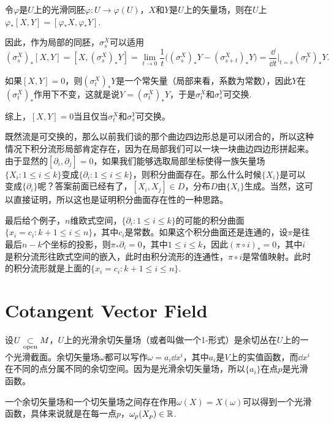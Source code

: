 \para 令$\varphi$是$U$上的光滑同胚$\varphi:U\to \varphi(U)$，$X$和$Y$是$U$上的矢量场，则在$U$上$\varphi_{*}[X,Y]=[\varphi_{*}X,\varphi_{*}Y]$.

因此，作为局部的同胚，$\sigma_s^X$可以适用
\[
	(\sigma_s^X)_*[X,Y]=[X,(\sigma_s^X)_*Y]=\lim_{t\to 0}\frac{1}{t}\bigl((\sigma_s^X)_*Y-(\sigma_{s+t}^X)_*Y\bigr)=\frac{\dd}{\dd t}\biggr|_{t=s}(\sigma_t^X)_*Y.
\]

如果$[X,Y]=0$，则$(\sigma_t^X)_*Y$是一个常矢量（局部来看，系数为常数），因此$Y$在$(\sigma_t^X)_*$作用下不变，这就是说$Y=(\sigma_t^X)_*Y$，于是$\sigma_t^X$和$\sigma_s^Y$可交换.

\para 综上，$[X,Y]=0$当且仅当$\sigma_t^X$和$\sigma_s^Y$可交换。

既然流是可交换的，那么以前我们谈的那个曲边四边形总是可以闭合的，所以这种情况下积分流形局部肯定存在，因为在局部我们可以一块一块曲边四边形拼起来。由于显然的$[\partial_i,\partial_j]=0$，如果我们能够选取局部坐标使得一族矢量场$\{X_i:1\leq i \leq k\}$变成$\{\partial_i:1\leq i \leq k\}$，则积分曲面存在。那么什么时候$\{X_i\}$是可以变成$\{\partial_i\}$呢？答案前面已经有了，$[X_i,X_j]\in D$，分布$D$由$\{X_i\}$生成。当然，这可以直接证明，所以这也是证明积分曲面存在性的一种思路。

最后给个例子，$n$维欧式空间，$\{\partial_i:1\leq i \leq k\}$的可能的积分曲面$\{x_i=c_i:k+1\leq i \leq n\}$，其中$c_i$是常数。如果这个积分曲面还是连通的，设$\pi$是往最后$n-k$个坐标的投影，则$\pi_*\partial_i=0$，其中$1\leq i \leq k$，因此$(\pi\circ i)_*=0$，其中$i$是积分流形往欧式空间的嵌入，此时由积分流形的连通性，$\pi\circ i$是常值映射。此时的积分流形就是上面的$\{x_i=c_i:k+1\leq i \leq n\}$.

\section{Cotangent Vector Field}

\para 设$U\underset{\mathrm{open}}{\subset} M$，$U$上的光滑余切矢量场（或者叫做一个1-形式）是余切丛在$U$上的一个光滑截面。余切矢量场$\omega$都可以写作$\omega=a_i\dd x^i$，其中$a_i$是$V$上的实值函数，而$\dd x^i$在不同的点分属不同的余切空间。因为是光滑余切矢量场，所以$\{a_i\}$在点$p$是光滑函数。

一个余切矢量场和一个切矢量场之间存在作用$\omega(X)=X(\omega)$可以得到一个光滑函数，具体来说就是在每一点$p$，$\omega_p(X_p)\in \mathbb{R}$.


